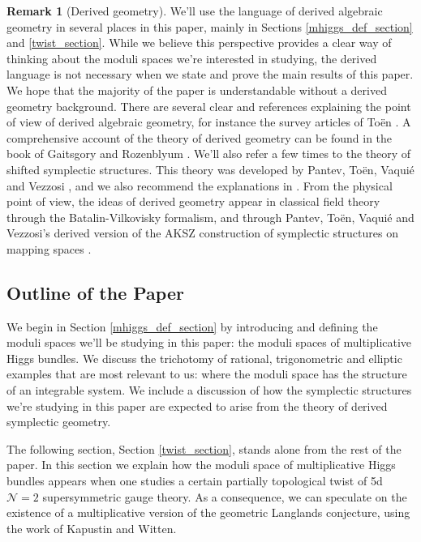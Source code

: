 \documentclass[11pt, oneside, reqno]{amsart}
\theoremstyle{definition} \newtheorem{definition}{Definition}[section]
\theoremstyle{definition} \newtheorem{remark}[definition]{Remark}
\theoremstyle{definition} \newtheorem{remarks}[definition]{Remarks}
\theoremstyle{definition} \newtheorem{question}[definition]{Question}
\theoremstyle{definition} \newtheorem*{note}{Note}
\theoremstyle{definition} \newtheorem{example}[definition]{Example}
\theoremstyle{definition} \newtheorem{examples}[definition]{Examples}
\newcommand{\mc}[1]{\mathcal{#1}}
\begin{document}
\begin{remark}[Derived geometry]
  We'll use the language of derived algebraic geometry in several places in this paper, mainly in Sections \ref{mhiggs_def_section} and \ref{twist_section}.  While we believe this perspective provides a clear way of thinking about the moduli spaces we're interested in studying, the derived language is not necessary when we state and prove the main results of this paper.  We hope that the majority of the paper is understandable without a derived geometry background.  There are several clear and references explaining the point of view of derived algebraic geometry, for instance the survey articles of To\"en \cite{ToenOverview,ToenSurvey}.  A comprehensive account of the theory of derived geometry can be found in the book of Gaitsgory and Rozenblyum \cite{GRvol1, GRvol2}.  We'll also refer a few times to the theory of shifted symplectic structures.  This theory was developed by Pantev, To\"en, Vaqui\'e and Vezzosi \cite{PTVV}, and we also recommend the explanations in \cite{Calaque}.  From the physical point of view, the ideas of derived geometry appear in classical field theory through the Batalin-Vilkovisky formalism, and through Pantev, To\"en, Vaqui\'e and Vezzosi's derived version of the AKSZ construction of symplectic structures on mapping spaces \cite{AKSZ}. 
\end{remark}

\subsection{Outline of the Paper}
We begin in Section \ref{mhiggs_def_section} by introducing and defining the moduli spaces we'll be studying in this paper: the moduli spaces of multiplicative Higgs bundles.  We discuss the trichotomy of rational, trigonometric and elliptic examples that are most relevant to us: where the moduli space has the structure of an integrable system.  We include a discussion of how the symplectic structures we're studying in this paper are expected to arise from the theory of derived symplectic geometry.

The following section, Section \ref{twist_section}, stands alone from the rest of the paper.  In this section we explain how the moduli space of multiplicative Higgs bundles appears when one studies a certain partially topological twist of 5d $\mc N=2$ supersymmetric gauge theory.  As a consequence, we can speculate on the existence of a multiplicative version of the geometric Langlands conjecture, using the work of Kapustin and Witten.
\end{document}
